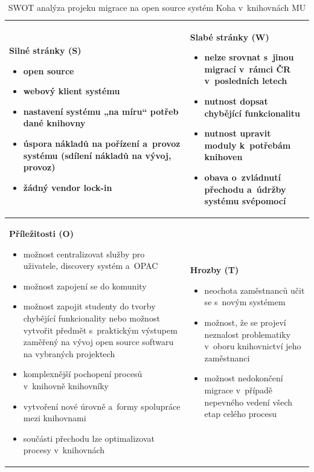 \documentclass[
	11pt, oneside, printed, final, palatino, monochrome
	microtype,
	table,   %
	lof,     %
	lot     %
]{fithesis3}
\newcommand{\bold}[1]{\textbf{#1}}
\begin{document}
{\begin{table}
    \centering
    \begin{tabular}{ p{5.8cm} | p{5.8cm} }
    \bold{Silné stránky (S)} 
    \begin{itemize}
		\item open source
		\item webový klient systému
		\item nastavení systému „na míru“ potřeb dané knihovny
		\item úspora nákladů na pořízení a~provoz systému (sdílení nákladů na vývoj, provoz)
		\item žádný vendor lock-in
	\end{itemize}
    & 
    \bold{Slabé stránky (W)} 
    \begin{itemize}
		\item nelze srovnat s~jinou migrací v~rámci ČR v~posledních letech
		\item nutnost dopsat chybějící funkcionalitu
		\item nutnost upravit moduly k~potřebám knihoven
		\item obava o~zvládnutí přechodu a~údržby systému svépomocí
	\end{itemize}
    \\ \hline
    
    \bold{Příležitosti (O)} 
    \begin{itemize}
		\item možnost centralizovat služby pro uživatele, discovery systém a~OPAC
		\item možnost zapojení se do komunity
		\item možnost zapojit studenty do tvorby chybějící funkcionality nebo možnost vytvořit předmět s~praktickým výstupem zaměřený na vývoj open source softwaru na vybraných projektech
		\item komplexnější pochopení procesů v~knihovně knihovníky
		\item vytvoření nové úrovně a~formy spolupráce mezi knihovnami
		\item součásti přechodu lze optimalizovat procesy v~knihovnách
	\end{itemize}
    & 
    \bold{Hrozby (T)} 
    \begin{itemize}
		\item neochota zaměstnanců učit se s~novým systémem
		\item možnost, že se projeví neznalost problematiky v~oboru knihovnictví jeho zaměstnanci
		\item možnost nedokončení migrace v~případě nepevného vedení všech etap celého procesu
	\end{itemize}
    \end{tabular}
    \caption{SWOT analýza projeku migrace na open source systém Koha v~knihovnách MU}
\end{table}

}
\end{document}
